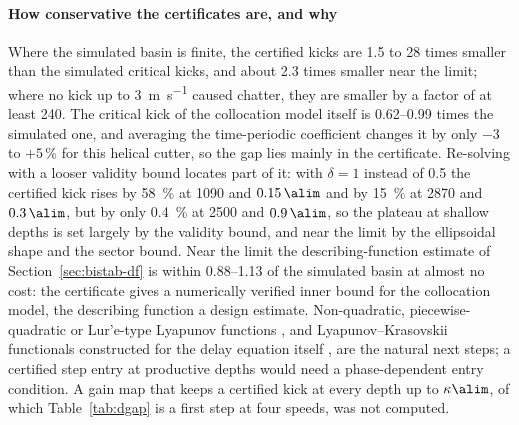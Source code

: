 \paragraph{How conservative the certificates are, and why}
Where the simulated basin is finite, the certified kicks are 1.5 to 28 times smaller than the simulated critical kicks, and about 2.3 times smaller near the limit; where no kick up to \SI{3}{\metre\per\second} caused chatter, they are smaller by a factor of at least 240. The critical kick of the collocation model itself is 0.62--0.99 times the simulated one, and averaging the time-periodic coefficient changes it by only $-3$ to $+5\,\%$ for this helical cutter, so the gap lies mainly in the certificate. Re-solving with a looser validity bound locates part of it: with $\delta=1$ instead of 0.5 the certified kick rises by \SI{58}{\percent} at \SI{1090}{\rpm} and $0.15\,\alim$ and by \SI{15}{\percent} at \SI{2870}{\rpm} and $0.3\,\alim$, but by only \SI{0.4}{\percent} at \SI{2500}{\rpm} and $0.9\,\alim$, so the plateau at shallow depths is set largely by the validity bound, and near the limit by the ellipsoidal shape and the sector bound. Near the limit the describing-function estimate of Section~\ref{sec:bistab-df} is within 0.88--1.13 of the simulated basin at almost no cost: the certificate gives a numerically verified inner bound for the collocation model, the describing function a design estimate. Non-quadratic, piecewise-quadratic or Lur'e-type Lyapunov functions \citep{hu2004lure,hu2006nonquadratic,dai2009piecewise}, and Lyapunov--Krasovskii functionals constructed for the delay equation itself \citep{papachristodoulou2009sos}, are the natural next steps; a certified step entry at productive depths would need a phase-dependent entry condition. A gain map that keeps a certified kick at every depth up to $\kappa\alim$, of which Table~\ref{tab:dgap} is a first step at four speeds, was not computed.


